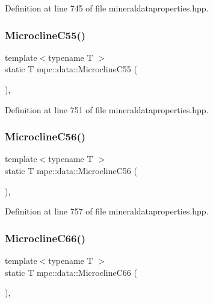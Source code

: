 Definition at line 745 of file mineraldataproperties.\+hpp.

\mbox{\label{namespacempc_1_1data_acf54811bdf54a84e396e7c02e5dd5dc1}} 
\subsubsection{\texorpdfstring{Microcline\+C55()}{MicroclineC55()}}
{\footnotesize\ttfamily template$<$typename T $>$ \\
static T mpc\+::data\+::\+Microcline\+C55 (\begin{DoxyParamCaption}{ }\end{DoxyParamCaption})\hspace{0.3cm}{\ttfamily [inline]}, {\ttfamily [static]}}



Definition at line 751 of file mineraldataproperties.\+hpp.

\mbox{\label{namespacempc_1_1data_a94a175419bc1d1795da26704fc110e44}} 
\subsubsection{\texorpdfstring{Microcline\+C56()}{MicroclineC56()}}
{\footnotesize\ttfamily template$<$typename T $>$ \\
static T mpc\+::data\+::\+Microcline\+C56 (\begin{DoxyParamCaption}{ }\end{DoxyParamCaption})\hspace{0.3cm}{\ttfamily [inline]}, {\ttfamily [static]}}



Definition at line 757 of file mineraldataproperties.\+hpp.

\mbox{\label{namespacempc_1_1data_a719804c10995fe2c854c3579f13c049d}} 
\subsubsection{\texorpdfstring{Microcline\+C66()}{MicroclineC66()}}
{\footnotesize\ttfamily template$<$typename T $>$ \\
static T mpc\+::data\+::\+Microcline\+C66 (\begin{DoxyParamCaption}{ }\end{DoxyParamCaption})\hspace{0.3cm}{\ttfamily [inline]}, {\ttfamily [static]}}



